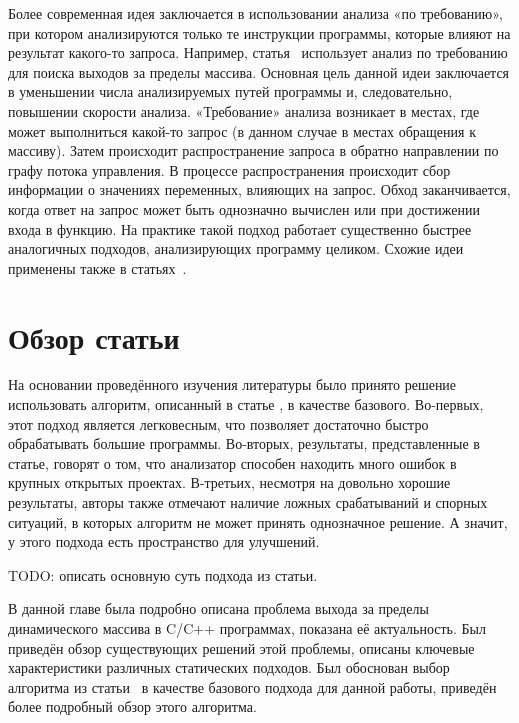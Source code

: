 Более современная идея заключается в использовании анализа «по
требованию», при котором анализируются только те инструкции программы,
которые влияют на результат какого-то запроса. Например,
статья~\cite{le2008marple} использует анализ по требованию для поиска
выходов за пределы массива. Основная цель данной идеи заключается в
уменьшении числа анализируемых путей программы и, следовательно,
повышении скорости анализа. «Требование» анализа возникает в местах,
где может выполниться какой-то запрос (в данном случае в местах
обращения к массиву). Затем происходит распространение запроса в
обратно направлении по графу потока управления. В процессе
распространения происходит сбор информации о значениях переменных,
влияющих на запрос. Обход заканчивается, когда ответ на запрос может
быть однозначно вычислен или при достижении входа в функцию. На
практике такой подход работает существенно быстрее аналогичных
подходов, анализирующих программу целиком. Схожие идеи применены также
в статьях~\cite{ding2012detection, ding2014abor}.

\section{Обзор статьи~\cite{li2010practical}}

На основании проведённого изучения литературы было принято решение
использовать алгоритм, описанный в статье \cite{li2010practical}, в
качестве базового. Во-первых, этот подход является легковесным, что
позволяет достаточно быстро обрабатывать большие программы. Во-вторых,
результаты, представленные в статье, говорят о том, что анализатор
способен находить много ошибок в крупных открытых проектах. В-третьих,
несмотря на довольно хорошие результаты, авторы также отмечают наличие
ложных срабатываний и спорных ситуаций, в которых алгоритм не может
принять однозначное решение. А значит, у этого подхода есть
пространство для улучшений.

TODO: описать основную суть подхода из статьи.

\chapterconclusion

В данной главе была подробно описана проблема выхода за пределы
динамического массива в C/C++ программах, показана её
актуальность. Был приведён обзор существующих решений этой проблемы,
описаны ключевые характеристики различных статических подходов. Был
обоснован выбор алгоритма из статьи~\cite{li2010practical} в качестве
базового подхода для данной работы, приведён более подробный обзор
этого алгоритма.
